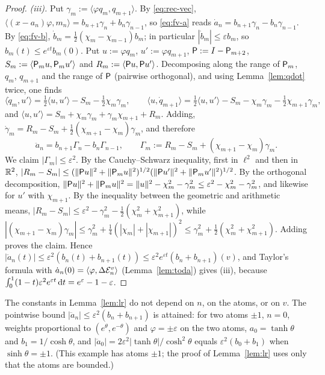 \begin{proof}
\emph{(iii).} Put $\gamma_m:=\langle\varphi q_m,q_{m+1}\rangle$. By \eqref{eq:rec-vec},
$\langle(x-a_n)\varphi,m_n\rangle=b_{n+1}\gamma_n+b_n\gamma_{n-1}$, so \eqref{eq:fv-a} reads
$\dot a_n=b_{n+1}\gamma_n-b_n\gamma_{n-1}$. By \eqref{eq:fv-b}, $\dot b_m=\frac12(\chi_m-\chi_{m-1})b_m$; in particular
$|\dot b_m|\le\varepsilon b_m$, so $b_m(t)\le e^{\varepsilon t}b_m(0)$. Put $u:=\varphi q_m$, $u':=\varphi q_{m+1}$,
$\mathsf{P}:=I-\mathsf{P}_{m+2}$, $S_m:=\langle\mathsf{P}_mu,\mathsf{P}_mu'\rangle$ and $R_m:=\langle\mathsf{P} u,\mathsf{P} u'\rangle$. Decomposing
along the range of $\mathsf{P}_m$, $q_m$, $q_{m+1}$ and the range of $\mathsf{P}$ (pairwise orthogonal), and using
Lemma~\ref{lem:qdot} twice, one finds
\[
  \langle\dot q_m,u'\rangle=\tfrac12\langle u,u'\rangle-S_m-\tfrac12\chi_m\gamma_m,\qquad
  \langle u,\dot q_{m+1}\rangle=\tfrac12\langle u,u'\rangle-S_m-\chi_m\gamma_m-\tfrac12\chi_{m+1}\gamma_m,
\]
and $\langle u,u'\rangle=S_m+\chi_m\gamma_m+\gamma_m\chi_{m+1}+R_m$. Adding,
$\dot\gamma_m=R_m-S_m+\frac12(\chi_{m+1}-\chi_m)\gamma_m$, and therefore
\[
  \ddot a_n=b_{n+1}\Gamma_n-b_n\Gamma_{n-1},\qquad \Gamma_m:=R_m-S_m+(\chi_{m+1}-\chi_m)\gamma_m .
\]
We claim $|\Gamma_m|\le\varepsilon^2$. By the Cauchy--Schwarz inequality, first in $\ell^2$ and then in $\mathbb{R}^2$,
$|R_m-S_m|\le(\|\mathsf{P} u\|^2+\|\mathsf{P}_mu\|^2)^{1/2}(\|\mathsf{P} u'\|^2+\|\mathsf{P}_mu'\|^2)^{1/2}$. By the orthogonal decomposition,
$\|\mathsf{P} u\|^2+\|\mathsf{P}_mu\|^2=\|u\|^2-\chi_m^2-\gamma_m^2\le\varepsilon^2-\chi_m^2-\gamma_m^2$, and likewise for $u'$
with $\chi_{m+1}$. By the inequality between the geometric and arithmetic means,
$|R_m-S_m|\le\varepsilon^2-\gamma_m^2-\frac12(\chi_m^2+\chi_{m+1}^2)$, while
$|(\chi_{m+1}-\chi_m)\gamma_m|\le\gamma_m^2+\frac14(|\chi_m|+|\chi_{m+1}|)^2\le\gamma_m^2+\frac12(\chi_m^2+\chi_{m+1}^2)$.
Adding proves the claim. Hence $|\ddot a_n(t)|\le\varepsilon^2(b_n(t)+b_{n+1}(t))\le\varepsilon^2e^{\varepsilon t}(b_n+b_{n+1})(v)$,
and Taylor's formula with $\dot a_n(0)=\langle\varphi,\Delta\mathcal{E}_n^v\rangle$ (Lemma~\ref{lem:toda}) gives (iii), because
$\int_0^1(1-t)\varepsilon^2e^{\varepsilon t}\,\mathrm{d} t=e^\varepsilon-1-\varepsilon$.
\end{proof}

\begin{remark}\label{rem:lr-sharp}
The constants in Lemma~\ref{lem:lr} do not depend on $n$, on the atoms, or on $v$. The pointwise bound
$|\ddot a_n|\le\varepsilon^2(b_n+b_{n+1})$ is attained: for two atoms $\pm1$, $n=0$, weights proportional to
$(e^\theta,e^{-\theta})$ and $\varphi=\pm\varepsilon$ on the two atoms, $a_0=\tanh\theta$ and $b_1=1/\cosh\theta$, and
$|\ddot a_0|=2\varepsilon^2|\tanh\theta|/\cosh^2\theta$ equals $\varepsilon^2(b_0+b_1)$ when $\sinh\theta=\pm1$. (This
example has atoms $\pm1$; the proof of Lemma~\ref{lem:lr} uses only that the atoms are bounded.)
\end{remark}

